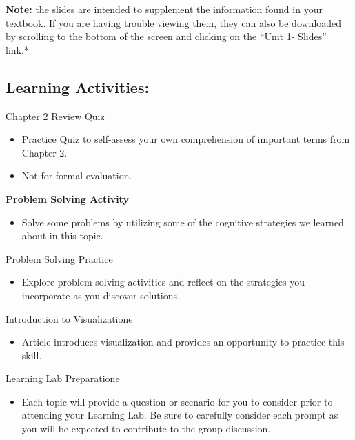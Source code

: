 \documentclass[
]{book}
\providecommand{\tightlist}{%
  \setlength{\itemsep}{0pt}\setlength{\parskip}{0pt}}
\begin{document}
\textbf{Note:} the slides are intended to supplement the information found in your textbook. If you are having trouble viewing them, they can also be downloaded by scrolling to the bottom of the screen and clicking on the ``Unit 1- Slides'' link.*

\hypertarget{learning-activities}{%
\subsection*{Learning Activities:}\label{learning-activities}}

\begin{reflect}
{Chapter 2 Review Quiz}

\begin{itemize}
\tightlist
\item
  Practice Quiz to self-assess your own comprehension of important terms from Chapter 2.\\
\item
  Not for formal evaluation.
\end{itemize}

\textbf{Problem Solving Activity}

\begin{itemize}
\tightlist
\item
  Solve some problems by utilizing some of the cognitive strategies we learned about in this topic.
\end{itemize}

{Problem Solving Practice}

\begin{itemize}
\tightlist
\item
  Explore problem solving activities and reflect on the strategies you incorporate as you discover solutions.
\end{itemize}

{Introduction to Visualizatione}

\begin{itemize}
\tightlist
\item
  Article introduces visualization and provides an opportunity to practice this skill.
\end{itemize}

{Learning Lab Preparatione}

\begin{itemize}
\tightlist
\item
  Each topic will provide a question or scenario for you to consider prior to attending your Learning Lab. Be sure to carefully consider each prompt as you will be expected to contribute to the group discussion.
\end{itemize}
\end{reflect}
\end{document}
